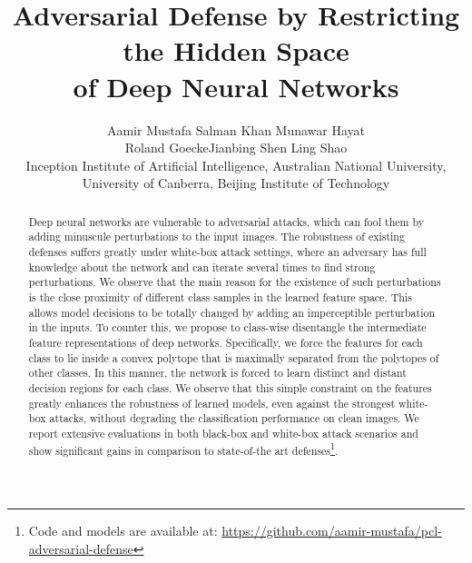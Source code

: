 \documentclass[10pt,twocolumn,letterpaper]{article}
\begin{document}
\title{\vspace{-1cm} Adversarial Defense by Restricting the Hidden Space\\ of Deep Neural Networks}

\vspace{-1cm}
\author{Aamir Mustafa \qquad Salman Khan \qquad Munawar Hayat \\
Roland Goecke\qquad Jianbing Shen \qquad Ling Shao\\
Inception Institute of Artificial Intelligence, Australian National University,\\
University of Canberra, Beijing Institute of Technology\\
}

\maketitle



\begin{abstract}
Deep neural networks are vulnerable to adversarial attacks, which can fool them by adding minuscule perturbations to the input images. The robustness of existing defenses suffers greatly under white-box attack settings, where an adversary has full knowledge about the network and can iterate several times to find strong perturbations. We observe that the main reason for the existence of such perturbations is the close proximity of different class samples in the learned feature space. This allows model decisions to be totally changed by adding an imperceptible perturbation in the inputs. To counter this, we propose to class-wise disentangle the intermediate feature representations of deep networks. Specifically, we force the features for each class to lie inside a convex polytope that is maximally separated from the polytopes of other classes. In this manner, the network is forced to learn distinct and distant decision regions for each class. We observe that this simple constraint on the features greatly enhances the robustness of learned models, even against the strongest white-box attacks, without degrading the classification performance on clean images. We report extensive evaluations in both black-box and white-box attack scenarios and show significant gains in comparison to state-of-the art defenses\footnote{Code and models are available at: \url{https://github.com/aamir-mustafa/pcl-adversarial-defense}}. 
\end{abstract}
\end{document}

